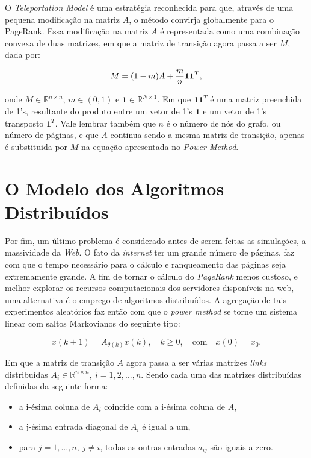 O \textit{Teleportation Model} é uma estratégia reconhecida para que, através de uma pequena modificação na matriz $A$, o método convirja globalmente para o PageRank. Essa modificação na matriz $A$ é representada como uma combinação convexa de duas matrizes, em que a matriz de transição agora passa a ser $M$, dada por:

\begin{equation}
M = (1-m)A + \frac{m}{n}{\bf11}^T,
\end{equation}

\noindent onde $M \in \mathbb{R}^{n \times n}$, $m \in (0,1)$ e $\textbf{1} \in \mathbb{R}^{N \times 1}$. Em que $\textbf{11}^T$ é uma matriz preenchida de 1's, resultante do produto entre um vetor de 1's $\textbf{1}$ e um vetor de 1's transposto $\textbf{1}^T$. Vale lembrar também que $n$ é o número de nós do grafo, ou número de páginas, e que $A$ continua sendo a mesma matriz de transição, apenas é substituida por $M$ na equação apresentada no \textit{Power Method}.


\section{O Modelo dos Algoritmos Distribu\'idos}%

Por fim, um último problema é considerado antes de serem feitas as simulações, a massividade da \textit{Web}. O fato da \textit{internet} ter um grande número de páginas, faz com que o tempo necessário para o cálculo e ranqueamento das páginas seja extremamente grande. A fim de tornar o cálculo do \textit{PageRank} menos custoso, e melhor explorar os recursos computacionais dos servidores disponíveis na web, uma alternativa é o emprego de algoritmos distribuídos. A agregação de tais experimentos aleatórios faz então com que o \textit{power method} se torne um sistema linear com saltos Markovianos do seguinte tipo:

\begin{equation}
	x(k+1) = A_{\theta(k)}x(k), \quad k\geq0, \quad \text{com} \quad x(0) = x_0. 
\end{equation}

Em que a matriz de transição $A$ agora passa a ser várias matrizes \textit{links} distribu\'idas $A_i \in \mathbb{R}^{n \times n}, \: i = 1,2, ..., n$. Sendo cada uma das matrizes distribuídas definidas da seguinte forma: 

\begin{itemize}
\item a i-ésima coluna de $A_i$ coincide com a i-ésima coluna de $A$,
\item a j-ésima entrada diagonal de $A_i$ é igual a um,
\item para $j = 1, ..., n, \: j \neq i$, todas as outras entradas $a_{ij}$ são iguais a zero.
\end{itemize}


